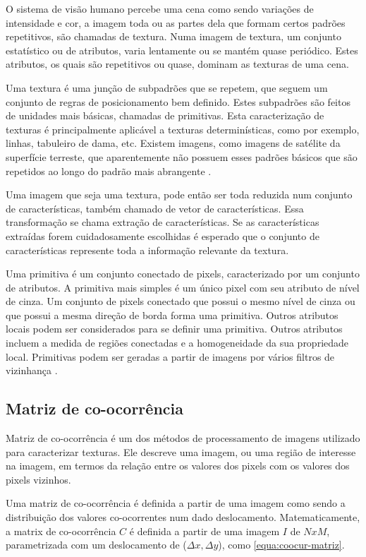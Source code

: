 O sistema de visão humano percebe uma cena como sendo variações de intensidade e cor, a imagem toda ou as partes dela que formam certos padrões repetitivos, são chamadas de textura. Numa imagem de textura, um conjunto estatístico ou de atributos, varia lentamente ou se mantém quase periódico. Estes atributos, os quais são repetitivos ou quase, dominam as texturas de uma cena.

Uma textura é uma junção de subpadrões que se repetem, que seguem um conjunto de regras de posicionamento bem definido. Estes subpadrões são feitos de unidades mais básicas, chamadas de primitivas. Esta caracterização de texturas é principalmente aplicável a texturas determinísticas, como por exemplo, linhas, tabuleiro de dama, etc. Existem imagens, como imagens de satélite da superfície terreste, que aparentemente não possuem esses padrões básicos que são repetidos ao longo do padrão mais abrangente \cite{acharya}.

Uma imagem que seja uma textura, pode então ser toda reduzida num conjunto de características, também chamado de vetor de características. Essa transformação se chama extração de características. Se as características extraídas forem cuidadosamente escolhidas é esperado que o conjunto de características represente toda a informação relevante da textura.

Uma primitiva é um conjunto conectado de pixels, caracterizado por um conjunto de atributos. A primitiva mais simples é um único pixel com seu atributo de nível de cinza. Um conjunto de pixels conectado que possui o mesmo nível de cinza ou que possui a mesma direção de borda forma uma primitiva. Outros atributos locais podem ser considerados para se definir uma primitiva. Outros atributos incluem a medida de regiões conectadas e a homogeneidade da sua propriedade local. Primitivas podem ser geradas a partir de imagens por vários filtros de vizinhança \cite{acharya}.

\subsection{Matriz de co-ocorrência}

Matriz de co-ocorrência é um dos métodos de processamento de imagens utilizado para caracterizar texturas. Ele descreve uma imagem, ou uma região de interesse na imagem, em termos da relação entre os valores dos pixels com os valores dos pixels vizinhos.

Uma matriz de co-ocorrência é definida a partir de uma imagem como sendo a distribuição dos valores co-ocorrentes num dado deslocamento. Matematicamente, a matrix de co-ocorrência $C$ é definida a partir de uma imagem $I$ de $N x M$, parametrizada com um deslocamento de ($\Delta{}x,\Delta{}y$), como \ref{equa:coocur-matriz}.

